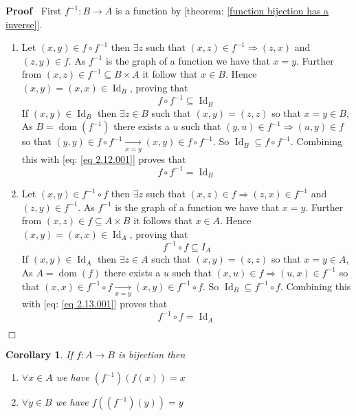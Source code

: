 \documentclass{book}
\newcommand{\Rightarrowlim}{\mathop{\rightarrow}\limits}
\newcommand{\tmop}[1]{\ensuremath{\operatorname{#1}}}
\newenvironment{proof}{\noindent\textbf{Proof\ }}{\hspace*{\fill}$\Box$\medskip}
\newtheorem{corollary}{Corollary}
\begin{document}
\begin{proof}
  First $f^{- 1} : B \rightarrow A$ is a function by [theorem: \ref{function
  bijection has a inverse}].
  \begin{enumerate}
    \item Let $(x, y) \in f \circ f^{- 1}$ then $\exists z$ such that $(x, z)
    \in f^{- 1} \Rightarrow (z, x)$ and $(z, y) \in f$. As $f^{- 1}$ is the
    graph of a function we have that $x = y$. Further from $(x, z) \in f^{- 1}
    \subseteq B \times A$ it follow that $x \in B$. Hence $(x, y) = (x, x) \in
    \tmop{Id}_B$, proving that
    \begin{equation}
      \label{eq 2.12.001} f \circ f^{- 1} \subseteq \tmop{Id}_B
    \end{equation}
    If $(x, y) \in \tmop{Id}_B$ then $\exists z \in B$ such that $(x, y) = (z,
    z)$ so that $x = y \in B$, As $B = \tmop{dom} (f^{- 1})$ there exists a
    $u$ such that $(y, u) \in f^{- 1} \Rightarrow (u, y) \in f$ so that $(y,
    y) \in f \circ f^{- 1} \Rightarrowlim_{x = y} (x, y) \in f \circ f^{- 1}$.
    So $\tmop{Id}_B \subseteq f \circ f^{- 1}$. Combining this with [eq:
    \ref{eq 2.12.001}] proves that
    \[ f \circ f^{- 1} = \tmop{Id}_B \]
    \item Let $(x, y) \in f^{- 1} \circ f$ then $\exists z$ such that $(x, z)
    \in f \Rightarrow (z, x) \in f^{- 1}$ and $(z, y) \in f^{- 1}$. As $f^{-
    1}$ is the graph of a function we have that $x = y$. Further from $(x, z)
    \in f \subseteq A \times B$ it follows that $x \in A$. Hence $(x, y) = (x,
    x) \in \tmop{Id}_A$, proving that
    \begin{equation}
      \label{eq 2.13.001} f^{- 1} \circ f \subseteq I_A
    \end{equation}
    If $(x, y) \in \tmop{Id}_A$ then $\exists z \in A$ such that $(x, y) = (z,
    z)$ so that $x = y \in A$, As $A = \tmop{dom} (f)$ there exists a $u$ such
    that $(x, u) \in f  \Rightarrow (u, x) \in f^{- 1}$ so that $(x, x) \in
    f^{- 1} \circ f \Rightarrowlim_{x = y} (x, y) \in f^{- 1} \circ f$. So
    $\tmop{Id}_B \subseteq f^{- 1} \circ f$. Combining this with [eq: \ref{eq
    2.13.001}] proves that
    \[ f^{- 1} \circ f = \tmop{Id}_A \]
  \end{enumerate}
\end{proof}

\begin{corollary}
  \label{function inverse function and f(x)}If $f : A \rightarrow B$ is
  bijection then
  \begin{enumerate}
    \item $\forall x \in A$ we have $(f^{- 1}) (f (x)) = x$
    
    \item $\forall y \in B$ we have $f ((f^{- 1}) (y)) = y$
  \end{enumerate}
\end{corollary}
\end{document}
